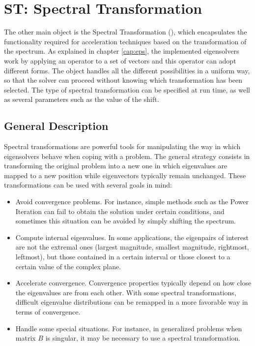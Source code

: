 \chapter{\label{cap:st}ST: Spectral Transformation}

\noindent The other main \slepc object is the Spectral Transformation (), which encapsulates the functionality required for acceleration techniques based on the transformation of the spectrum. As explained in chapter \ref{cap:eps}, the implemented eigensolvers work by applying an operator to a set of vectors and this operator can adopt different forms. The  object handles all the different possibilities in a uniform way, so that the solver can proceed without knowing which transformation has been selected. The type of spectral transformation can be specified at run time, as well as several parameters such as the value of the shift.
	
\section{General Description}

	Spectral transformations are powerful tools for manipulating the way in which eigensolvers behave when coping with a problem. The general strategy consists in transforming the original problem into a new one in which eigenvalues are mapped to a new position while eigenvectors typically remain unchanged. These transformations can be used with several goals in mind:
\begin{itemize}
\item Avoid convergence problems. For instance, simple methods such as the Power Iteration can fail to obtain the solution under certain conditions, and sometimes this situation  can be avoided by simply shifting the spectrum.
\item Compute internal eigenvalues. In some applications, the eigenpairs of interest are not the extremal ones (largest magnitude, smallest magnitude, rightmost, leftmost), but those contained in a certain interval or those closest to a certain value of the complex plane.
\item Accelerate convergence. Convergence properties typically depend on how close the eigenvalues are from each other. With some spectral transformations, difficult eigenvalue distributions can be remapped in a more favorable way in terms of convergence. 
\item Handle some special situations. For instance, in generalized problems when matrix $B$ is singular, it may be necessary to use a spectral transformation.
\end{itemize}
	
